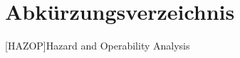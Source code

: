 \chapter*{Abk\"urzungsverzeichnis}
\begin{acronym}[HAZOP] %
	[HAZOP]{Hazard and Operability Analysis}
\end{acronym}